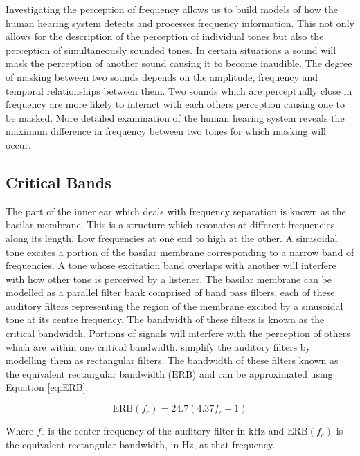 		Investigating the perception of frequency allows us to build models of how the human hearing system detects
		and processes frequency information. This not only allows for the description of the perception of
		individual tones but also the perception of simultaneously sounded tones. In certain situations a sound
		will mask the perception of another sound causing it to become inaudible. The degree of masking between two
		sounds depends on the amplitude, frequency and temporal relationships between them. Two sounds which are
		perceptually close in frequency are more likely to interact with each others perception causing one to be
		masked. More detailed examination of the human hearing system reveals the maximum difference in frequency
		between two tones for which masking will occur.

	\subsection{Critical Bands}
	\label{sec:Timbre-PsychoacousticPrinciples-CriticalBands}
		The part of the inner ear which deals with frequency separation is known as the basilar membrane. This is a
		structure which resonates at different frequencies along its length. Low frequencies at one end to high at
		the other. A sinusoidal tone excites a portion of the basilar membrane corresponding to a narrow band of
		frequencies. A tone whose excitation band overlaps with another will interfere with how other tone is
		perceived by a listener. The basilar membrane can be modelled as a parallel filter bank comprised of band
		pass filters, each of these auditory filters representing the region of the membrane excited by a
		sinusoidal tone at its centre frequency. The bandwidth of these filters is known as the critical bandwidth.
		Portions of signals will interfere with the perception of others which are within one critical bandwidth.
		\citet{glasberg1990derivation} simplify the auditory filters by modelling them as rectangular filters. The
		bandwidth of these filters known as the equivalent rectangular bandwidth ($\mathrm{ERB}$) and can be
		approximated using Equation \ref{eq:ERB}.

		\begin{equation}
			\mathrm{ERB}(f_{c}) = 24.7(4.37f_{c} + 1)
			\label{eq:ERB}
		\end{equation}

		Where $f_{c}$ is the center frequency of the auditory filter in kHz and $\mathrm{ERB}(f_{c})$ is the
		equivalent rectangular bandwidth, in Hz, at that frequency.

